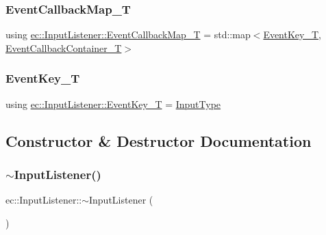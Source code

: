 \mbox{\label{classec_1_1_input_listener_a13553604a5ae8c32fa95d304206aa01a}} 
\subsubsection{\texorpdfstring{Event\+Callback\+Map\+\_\+T}{EventCallbackMap\_T}}
{\footnotesize\ttfamily using \mbox{\hyperlink{classec_1_1_input_listener_a13553604a5ae8c32fa95d304206aa01a}{ec\+::\+Input\+Listener\+::\+Event\+Callback\+Map\+\_\+T}} =  std\+::map$<$\mbox{\hyperlink{namespaceec_a5de6bdb8c4b2ed6e590e721ec998f964}{Event\+Key\+\_\+T}}, \mbox{\hyperlink{classec_1_1_input_listener_a3bb7086fdca1d1a76428b1e737e9e002}{Event\+Callback\+Container\+\_\+T}}$>$}

\mbox{\label{classec_1_1_input_listener_a741cc6a2d59a823b5bfbc4e48e1a147f}} 
\subsubsection{\texorpdfstring{Event\+Key\+\_\+T}{EventKey\_T}}
{\footnotesize\ttfamily using \mbox{\hyperlink{namespaceec_a5de6bdb8c4b2ed6e590e721ec998f964}{ec\+::\+Input\+Listener\+::\+Event\+Key\+\_\+T}} =  \mbox{\hyperlink{namespaceec_a5de6bdb8c4b2ed6e590e721ec998f964}{Input\+Type}}}



\subsection{Constructor \& Destructor Documentation}
\mbox{\label{classec_1_1_input_listener_afd65ca201e735f5758646d6653f42804}} 
\subsubsection{\texorpdfstring{$\sim$\+Input\+Listener()}{~InputListener()}}
{\footnotesize\ttfamily ec\+::\+Input\+Listener\+::$\sim$\+Input\+Listener (\begin{DoxyParamCaption}{ }\end{DoxyParamCaption})\hspace{0.3cm}{\ttfamily [virtual]}}

